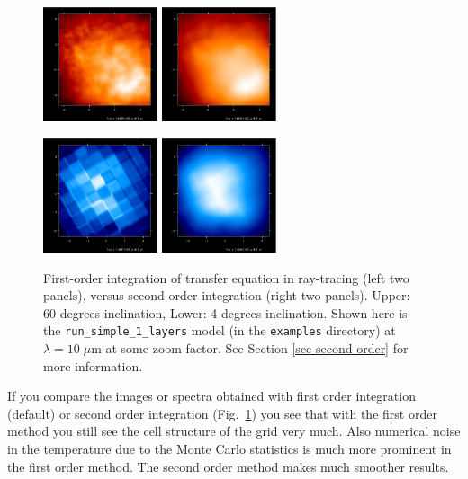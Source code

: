 \documentclass{report}
\begin{document}
%
\begin{figure}
\centerline{\includegraphics[width=0.3\textwidth]{simple_60_1st.eps}
            \includegraphics[width=0.3\textwidth]{simple_60_2nd.eps}}
\centerline{\includegraphics[width=0.3\textwidth]{simple_4_1st.eps}
            \includegraphics[width=0.3\textwidth]{simple_4_2nd.eps}}
\caption{\label{fig-effect-of-second-order-integration}
First-order integration of transfer equation in ray-tracing (left two
panels), versus second order integration (right two panels). Upper:
60 degrees inclination, Lower: 4 degrees inclination. Shown here is
the {\small\tt run\_simple\_1\_layers} model (in the {\small\tt examples}
directory) at $\lambda=10\;\mu$m at some zoom factor. See Section
  \ref{sec-second-order} for more information.
}
\end{figure}
%
If you compare the images or spectra obtained with first order integration
(default) or second order integration
(Fig.~\ref{fig-effect-of-second-order-integration}) you see that with the
first order method you still see the cell structure of the grid very much.
Also numerical noise in the temperature due to the Monte Carlo statistics
is much more prominent in the first order method. The second order method
makes much smoother results. 
\end{document}
